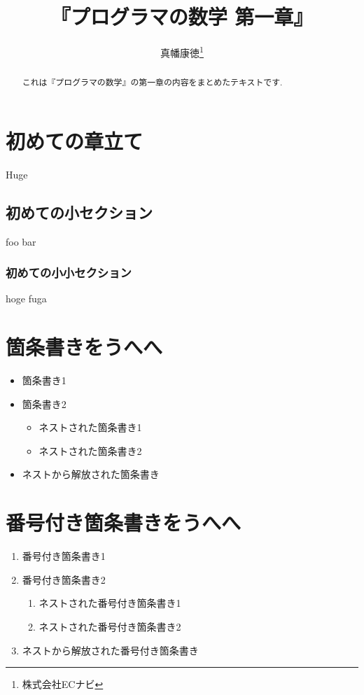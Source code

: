 \documentclass[10pt, twocolumn]{jarticle}
\title{『プログラマの数学 第一章』}
\author{真幡康徳\thanks{株式会社ECナビ}}
\begin{document}
\maketitle
\begin{abstract}
これは『プログラマの数学』の第一章の内容をまとめたテキストです.
\end{abstract}

\section{初めての章立て}
{\Huge Huge}

\subsection{初めての小セクション}

foo bar

\subsubsection{初めての小小セクション}

hoge fuga

\section{箇条書きをうへへ}

\begin{itemize}
  \item 箇条書き1
  \item 箇条書き2
  \begin{itemize}
    \item ネストされた箇条書き1
    \item ネストされた箇条書き2
  \end{itemize}
  \item ネストから解放された箇条書き
\end{itemize}

\section{番号付き箇条書きをうへへ}

\begin{enumerate}
  \item 番号付き箇条書き1
  \item 番号付き箇条書き2
  \begin{enumerate}
    \item ネストされた番号付き箇条書き1
    \item ネストされた番号付き箇条書き2
  \end{enumerate}
  \item ネストから解放された番号付き箇条書き
\end{enumerate}
\end{document}
